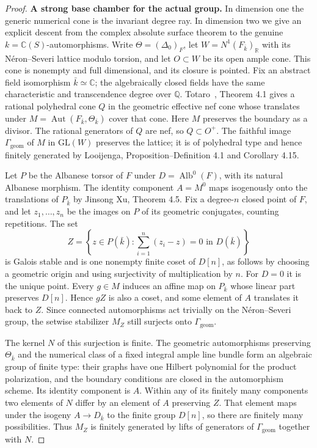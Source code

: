 \documentclass[11pt]{article}
\begin{document}
\begin{proof}
\textbf{A strong base chamber for the actual group.} In dimension one the generic numerical cone is the
invariant degree ray. In dimension two we give an explicit descent from the complex absolute surface
theorem to the genuine \(k=\mathbb C(S)\)-automorphisms. Write \(\Theta=(\Delta_0)_F\), let
\(W=N^1(F_{\bar k})_\mathbb R\) with its Néron--Severi lattice modulo torsion, and let \(O\subset W\) be
its open ample cone. This cone is nonempty and full dimensional, and its closure is pointed. Fix an
abstract field isomorphism \(\bar k\simeq\mathbb C\); the algebraically closed fields have the same
characteristic and transcendence degree over \(\mathbb Q\). Totaro~\cite{Totaro}, Theorem 4.1 gives a
rational polyhedral cone \(Q\) in the geometric effective nef cone whose translates under
\(M=\operatorname{Aut}(F_{\bar k},\Theta_{\bar k})\) cover that cone. Here \(M\) preserves the boundary
as a divisor. The rational generators of \(Q\) are nef, so \(Q\subset O^+\). The faithful image
\(\Gamma_{\mathrm{geom}}\) of \(M\) in \(\mathrm{GL}(W)\) preserves the lattice; it is of polyhedral type
and hence finitely generated by Looijenga, Proposition--Definition 4.1 and Corollary 4.15.

Let \(P\) be the Albanese torsor of \(F\) under \(D=\operatorname{Alb}^0(F)\), with its natural Albanese morphism. The identity component \(A=M^0\) maps isogenously onto the translations of \(P_{\bar k}\) by Jinsong Xu, Theorem 4.5. Fix a degree-\(n\) closed point of \(F\), and let \(z_1,\ldots,z_n\) be the images on \(P\) of its geometric conjugates, counting repetitions. The set \[
 Z=\left\{z\in P(\bar k):\sum_{i=1}^n(z_i-z)=0\text{ in }D(\bar k)\right\}
\] is Galois stable and is one nonempty finite coset of \(D[n]\), as follows by choosing a geometric origin and using surjectivity of multiplication by \(n\). For \(D=0\) it is the unique point. Every \(g\in M\) induces an affine map on \(P_{\bar k}\) whose linear part preserves \(D[n]\). Hence \(gZ\) is also a coset, and some element of \(A\) translates it back to \(Z\). Since connected automorphisms act trivially on the Néron--Severi group, the setwise stabilizer \(M_Z\) still surjects onto \(\Gamma_{\mathrm{geom}}\).

The kernel \(N\) of this surjection is finite. The geometric automorphisms preserving \(\Theta_{\bar k}\)
and the numerical class of a fixed integral ample line bundle form an algebraic group of finite type:
their graphs have one Hilbert polynomial for the product polarization, and the boundary conditions are
closed in the automorphism scheme. Its identity component is \(A\). Within any of its finitely many
components two elements of \(N\) differ by an element of \(A\) preserving \(Z\). That element maps under
the isogeny \(A\to D_{\bar k}\) to the finite group \(D[n]\), so there are finitely many possibilities.
Thus \(M_Z\) is finitely generated by lifts of generators of \(\Gamma_{\mathrm{geom}}\) together with
\(N\).


\end{proof}
\end{document}
